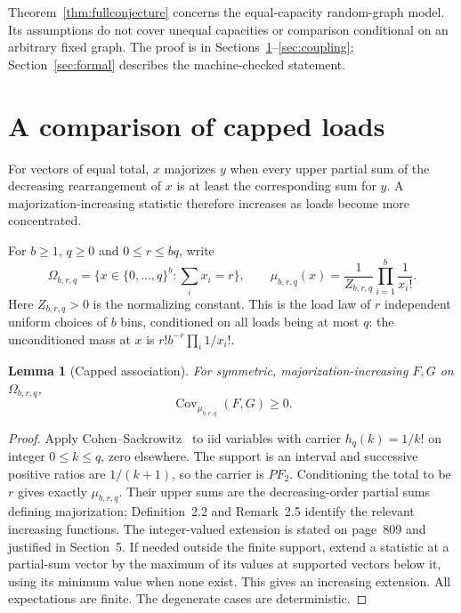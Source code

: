 \documentclass[11pt]{article}
\newtheorem{lemma}[theorem]{Lemma}
\begin{document}
Theorem~\ref{thm:fullconjecture} concerns the equal-capacity random-graph
model. Its assumptions do not cover unequal capacities or comparison
conditional on an arbitrary fixed graph. The proof is in
Sections~\ref{sec:loads}--\ref{sec:coupling};
Section~\ref{sec:formal} describes the machine-checked statement.

\section{A comparison of capped loads}\label{sec:loads}
For vectors of equal total, $x$ majorizes $y$ when every upper partial
sum of the decreasing rearrangement of $x$ is at least the corresponding
sum for $y$. A majorization-increasing statistic therefore increases as
loads become more concentrated.

For $b\geq1$, $q\geq0$ and $0\leq r\leq bq$, write
\[
 \Omega_{b,r,q}=\{x\in\{0,\ldots,q\}^b:\textstyle\sum_i x_i=r\},
 \qquad \mu_{b,r,q}(x)=\frac1{Z_{b,r,q}}\prod_{i=1}^b\frac1{x_i!}.
\]
Here $Z_{b,r,q}>0$ is the normalizing constant. This is the load law of
$r$ independent uniform choices of $b$ bins, conditioned on all loads
being at most $q$: the unconditioned mass at $x$ is
$r!b^{-r}\prod_i1/x_i!$.

\begin{lemma}[Capped association]\label{lem:csassociation}
For symmetric, majorization-increasing $F,G$ on $\Omega_{b,r,q}$,
\[
 \operatorname{Cov}_{\mu_{b,r,q}}(F,G)\geq0.
\]
\end{lemma}
\begin{proof}
Apply Cohen--Sackrowitz~\cite[Lemma 4.1]{cs} to iid variables with
carrier $h_q(k)=1/k!$ on integer $0\leq k\leq q$, zero elsewhere.
The support is an interval and successive positive ratios are
$1/(k+1)$, so the carrier is $PF_2$. Conditioning the total to be $r$
gives exactly $\mu_{b,r,q}$. Their upper sums are the decreasing-order
partial sums defining majorization; Definition~2.2 and Remark~2.5 identify
the relevant increasing functions. The integer-valued extension is stated
on page~809 and justified in Section~5. If needed outside the finite
support, extend a statistic at a partial-sum vector by the maximum of its
values at supported vectors below it, using its minimum value when none
exist. This gives an increasing extension. All expectations are finite.
The degenerate cases are deterministic.
\end{proof}
\end{document}
